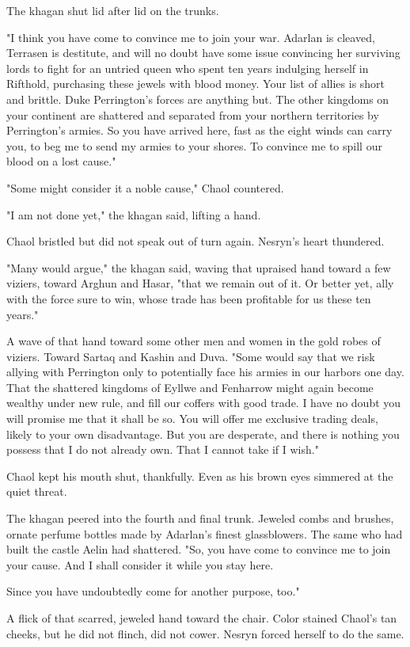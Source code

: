 The khagan shut lid after lid on the trunks.

"I think you have come to convince me to join your war.
Adarlan is cleaved, Terrasen is destitute, and will no doubt have some issue convincing her surviving lords to fight for an untried queen who spent ten years indulging herself in Rifthold, purchasing these jewels with blood money.
Your list of allies is short and brittle.
Duke Perrington's forces are anything but.
The other kingdoms on your continent are shattered and separated from your northern territories by Perrington's armies.
So you have arrived here, fast as the eight winds can carry you, to beg me to send my armies to your shores.
To convince me to spill our blood on a lost cause."

"Some might consider it a noble cause," Chaol countered.

"I am not done yet," the khagan said, lifting a hand.

Chaol bristled but did not speak out of turn again.
Nesryn's heart thundered.

"Many would argue," the khagan said, waving that upraised hand toward a few viziers, toward Arghun and Hasar, "that we remain out of it.
Or better yet, ally with the force sure to win, whose trade has been profitable for us these ten years."

A wave of that hand toward some other men and women in the gold robes of viziers.
Toward Sartaq and Kashin and Duva.
"Some would say that we risk allying with Perrington only to potentially face his armies in our harbors one day.
That the shattered kingdoms of Eyllwe and Fenharrow might again become wealthy under new rule, and fill our coffers with good trade.
I have no doubt you will promise me that it shall be so.
You will offer me exclusive trading deals, likely to your own disadvantage.
But you are desperate, and there is nothing you possess that I do not already own.
That I cannot take if I wish."

Chaol kept his mouth shut, thankfully.
Even as his brown eyes simmered at the quiet threat.

The khagan peered into the fourth and final trunk.
Jeweled combs and brushes, ornate perfume bottles made by Adarlan's finest glassblowers.
The same who had built the castle Aelin had shattered.
"So, you have come to convince me to join your cause.
And I shall consider it while you stay here.

Since you have undoubtedly come for another purpose, too."

A flick of that scarred, jeweled hand toward the chair.
Color stained Chaol's tan cheeks, but he did not flinch, did not cower.
Nesryn forced herself to do the same.

